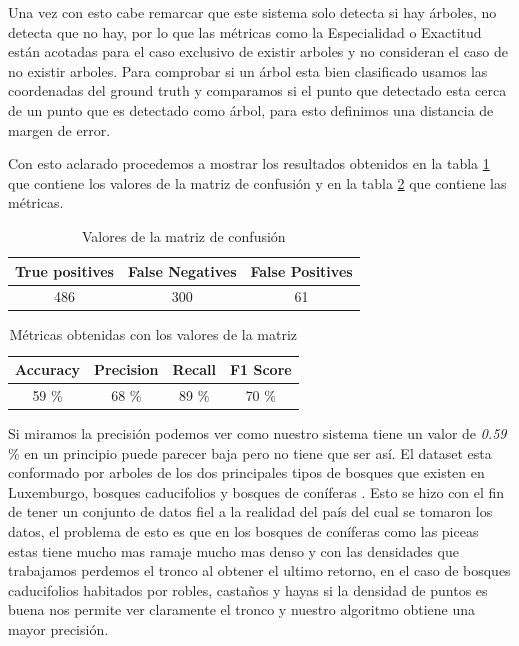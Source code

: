 Una vez con esto cabe remarcar que este sistema solo detecta si hay árboles, no detecta que no hay, por lo que las métricas como la Especialidad o Exactitud están acotadas para el caso exclusivo de existir arboles y no consideran el caso de no existir arboles.
Para comprobar si un árbol esta bien clasificado usamos las coordenadas del ground truth y comparamos si el punto que detectado esta cerca de un punto que es detectado como árbol, para esto definimos una distancia de margen de error.

Con esto aclarado procedemos a mostrar los resultados obtenidos en la tabla \ref{tablaconf} que contiene los valores de la matriz de confusión y en la tabla \ref{tablaMetr} que contiene las métricas.
\begin{table}[h]
\centering
{}
\begin{tabular}{c|c|c}
\rowcolor{udcpink!25}
\textbf{True positives} & \textbf{False Negatives} & \textbf{False Positives} \\\hline
486 & 300 & 61 \\
\end{tabular}
\caption{Valores de la matriz de confusión}
\label{tablaconf}
\end{table}

\begin{table}[h]
\centering
{}
\begin{tabular}{c|c|c|c}
\rowcolor{udcpink!25}
\textbf{Accuracy} & \textbf{Precision} & \textbf{Recall} & \textbf{F1 Score} \\\hline
59 \% & 68 \% & 89 \% & 70 \% \\
\end{tabular}
\caption{Métricas obtenidas con los valores de la matriz}
\label{tablaMetr}
\end{table}

Si miramos la precisión podemos ver como nuestro sistema tiene un valor de \textit{0.59} \% en un principio puede parecer baja pero no tiene que ser así. El dataset esta conformado por arboles de los dos principales tipos de bosques que existen en Luxemburgo, bosques caducifolios y bosques de coníferas \cite{luxfores}. Esto se hizo con el fin de tener un conjunto de datos fiel a la realidad del país del cual se tomaron los datos, el problema de esto es que en los bosques de coníferas como las piceas estas tiene mucho mas ramaje mucho mas denso y con las densidades que trabajamos perdemos el tronco al obtener el ultimo retorno, en el caso de bosques caducifolios habitados por robles, castaños y hayas si la densidad de puntos es buena nos permite ver claramente el tronco y nuestro algoritmo obtiene una mayor precisión. 

